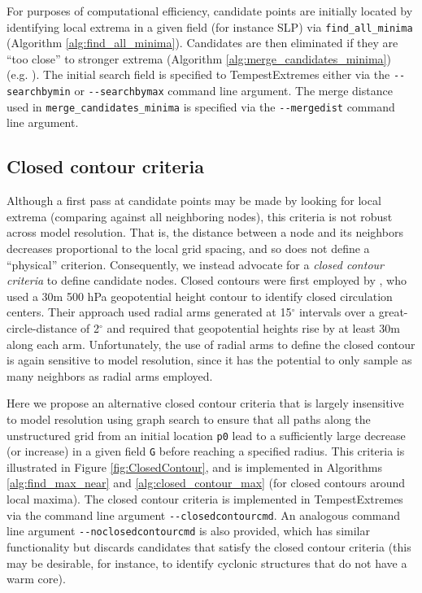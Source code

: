 \documentclass[gmdd, hvmath]{copernicus}
\begin{document}
For purposes of computational efficiency, candidate points are initially located by identifying local extrema in a given field (for instance SLP) via \texttt{find\_all\_minima} (Algorithm \ref{alg:find_all_minima}).  Candidates are then eliminated if they are ``too close'' to stronger extrema (Algorithm \ref{alg:merge_candidates_minima}) (e.g. \cite{pinto2005sensitivities}).  The initial search field is specified to TempestExtremes either via the \texttt{-\;\!\!-searchbymin} or \texttt{-\;\!\!-searchbymax} command line argument.  The merge distance used in \texttt{merge\_candidates\_minima} is specified via the \texttt{-\;\!\!-mergedist} command line argument.

\subsection{Closed contour criteria} \label{sec:ClosedContour}

Although a first pass at candidate points may be made by looking for local extrema (comparing against all neighboring nodes), this criteria is not robust across model resolution.  That is, the distance between a node and its neighbors decreases proportional to the local grid spacing, and so does not define a ``physical'' criterion.  Consequently, we instead advocate for a \textit{closed contour criteria} to define candidate nodes.  Closed contours were first employed by \cite{bell198915}, who used a 30m 500 hPa geopotential height contour to identify closed circulation centers.  Their approach used radial arms generated at 15$^\circ$ intervals over a great-circle-distance of 2$^\circ$ and required that geopotential heights rise by at least 30m along each arm.  Unfortunately, the use of radial arms to define the closed contour is again sensitive to model resolution, since it has the potential to only sample as many neighbors as radial arms employed.

Here we propose an alternative closed contour criteria that is largely insensitive to model resolution using graph search to ensure that all paths along the unstructured grid from an initial location \texttt{p0} lead to a sufficiently large decrease (or increase) in a given field \texttt{G} before reaching a specified radius.  This criteria is illustrated in Figure \ref{fig:ClosedContour}, and is implemented in Algorithms \ref{alg:find_max_near} and \ref{alg:closed_contour_max} (for closed contours around local maxima).  The closed contour criteria is implemented in TempestExtremes via the command line argument \texttt{-\;\!\!-closedcontourcmd}.  An analogous command line argument \texttt{-\;\!\!-noclosedcontourcmd} is also provided, which has similar functionality but discards candidates that satisfy the closed contour criteria (this may be desirable, for instance, to identify cyclonic structures that do not have a warm core).
\end{document}
